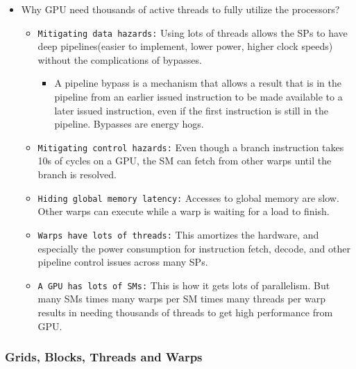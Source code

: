 \documentclass[../main.tex]{subfiles}
\begin{document}
\begin{itemize}
\begin{itemize}
	      \end{itemize}
	\item Why GPU need thousands of active threads to fully utilize the processors?
	      \begin{itemize}
		      \item \texttt{Mitigating data hazards:} Using lots of threads allows the SPs to have deep pipelines(easier to implement, lower power, higher clock speeds) without the complications of bypasses.
		            \begin{itemize}
			            \item A pipeline bypass is a mechanism that allows a result that is in the pipeline from an earlier issued instruction to be made available to a later issued instruction, even if the first instruction is still in the pipeline. Bypasses are energy hogs.
		            \end{itemize}
		      \item \texttt{Mitigating control hazards:} Even though a branch instruction takes 10s of cycles on a GPU, the SM can fetch from other warps until the branch is resolved.
		      \item \texttt{Hiding global memory latency:} Accesses to global memory are slow. Other warps can execute while a warp is waiting for a load to finish.
		      \item \texttt{Warps have lots of threads:} This amortizes the hardware, and especially the power consumption for instruction fetch, decode, and other pipeline control issues across many SPs.
		      \item \texttt{A GPU has lots of SMs:} This is how it gets lots of parallelism. But many SMs times many warps per SM times many threads per warp results in needing thousands of threads to get high performance from GPU.
	      \end{itemize}
\end{itemize}

\subsubsection{Grids, Blocks, Threads and Warps}
\end{document}
